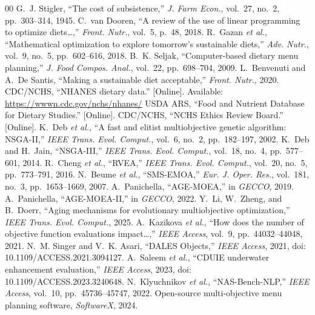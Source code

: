 \documentclass{ieeeaccess}
\begin{document}
\begin{thebibliography}{00}
 G.~J. Stigler, ``The cost of subsistence,'' \emph{J. Farm Econ.}, vol.~27, no.~2, pp.~303--314, 1945.
 C.~van Dooren, ``A review of the use of linear programming to optimize diets\ldots,'' \emph{Front. Nutr.}, vol.~5, p.~48, 2018.
 R.~Gazan \emph{et al.}, ``Mathematical optimization to explore tomorrow's sustainable diets,'' \emph{Adv. Nutr.}, vol.~9, no.~5, pp.~602--616, 2018.
 B.~K. Seljak, ``Computer-based dietary menu planning,'' \emph{J. Food Compos. Anal.}, vol.~22, pp.~698--704, 2009.
 L.~Benvenuti and A.~De Santis, ``Making a sustainable diet acceptable,'' \emph{Front. Nutr.}, 2020.
 CDC/NCHS, ``NHANES dietary data.'' [Online]. Available: \url{https://wwwn.cdc.gov/nchs/nhanes/}
 USDA ARS, ``Food and Nutrient Database for Dietary Studies.'' [Online].
 CDC/NCHS, ``NCHS Ethics Review Board.'' [Online].
 K.~Deb \emph{et al.}, ``A fast and elitist multiobjective genetic algorithm: NSGA-II,'' \emph{IEEE Trans. Evol. Comput.}, vol.~6, no.~2, pp.~182--197, 2002.
 K.~Deb and H.~Jain, ``NSGA-III,'' \emph{IEEE Trans. Evol. Comput.}, vol.~18, no.~4, pp.~577--601, 2014.
 R.~Cheng \emph{et al.}, ``RVEA,'' \emph{IEEE Trans. Evol. Comput.}, vol.~20, no.~5, pp.~773--791, 2016.
 N.~Beume \emph{et al.}, ``SMS-EMOA,'' \emph{Eur. J. Oper. Res.}, vol.~181, no.~3, pp.~1653--1669, 2007.
 A.~Panichella, ``AGE-MOEA,'' in \emph{GECCO}, 2019.
 A.~Panichella, ``AGE-MOEA-II,'' in \emph{GECCO}, 2022.
 Y.~Li, W.~Zheng, and B.~Doerr, ``Aging mechanisms for evolutionary multiobjective optimization,'' \emph{IEEE Trans. Evol. Comput.}, 2025.
 A.~Kazikova \emph{et al.}, ``How does the number of objective function evaluations impact\ldots,'' \emph{IEEE Access}, vol.~9, pp.~44032--44048, 2021.
 N.~M. Singer and V.~K. Asari, ``DALES Objects,'' \emph{IEEE Access}, 2021, doi: 10.1109/ACCESS.2021.3094127.
 A.~Saleem \emph{et al.}, ``CDUIE underwater enhancement evaluation,'' \emph{IEEE Access}, 2023, doi: 10.1109/ACCESS.2023.3240648.
 N.~Klyuchnikov \emph{et al.}, ``NAS-Bench-NLP,'' \emph{IEEE Access}, vol.~10, pp.~45736--45747, 2022.
 Open-source multi-objective menu planning software, \emph{SoftwareX}, 2024.
\end{thebibliography}
\end{document}
